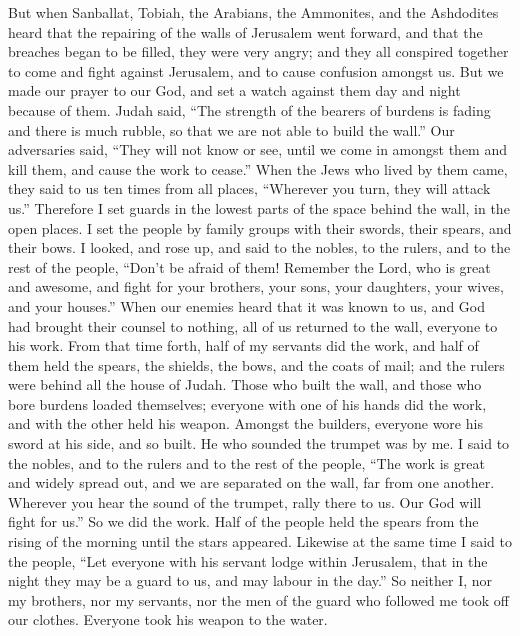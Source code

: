  But when Sanballat, Tobiah, the Arabians, the Ammonites,
and the Ashdodites heard that the repairing of the walls of Jerusalem
went forward, and that the breaches began to be filled, they were very
angry;  and they all conspired together to come and fight
against Jerusalem, and to cause confusion amongst us.  But
we made our prayer to our God, and set a watch against them day and
night because of them.  Judah said, ``The strength of the
bearers of burdens is fading and there is much rubble, so that we are
not able to build the wall.''  Our adversaries said,
``They will not know or see, until we come in amongst them and kill
them, and cause the work to cease.''  When the Jews who
lived by them came, they said to us ten times from all places,
``Wherever you turn, they will attack us.''  Therefore I
set guards in the lowest parts of the space behind the wall, in the open
places. I set the people by family groups with their swords, their
spears, and their bows.  I looked, and rose up, and said
to the nobles, to the rulers, and to the rest of the people, ``Don't be
afraid of them! Remember the Lord, who is great and awesome, and fight
for your brothers, your sons, your daughters, your wives, and your
houses.''  When our enemies heard that it was known to
us, and God had brought their counsel to nothing, all of us returned to
the wall, everyone to his work.  From that time forth,
half of my servants did the work, and half of them held the spears, the
shields, the bows, and the coats of mail; and the rulers were behind all
the house of Judah.  Those who built the wall, and those
who bore burdens loaded themselves; everyone with one of his hands did
the work, and with the other held his weapon.  Amongst
the builders, everyone wore his sword at his side, and so built. He who
sounded the trumpet was by me.  I said to the nobles, and
to the rulers and to the rest of the people, ``The work is great and
widely spread out, and we are separated on the wall, far from one
another.  Wherever you hear the sound of the trumpet,
rally there to us. Our God will fight for us.''  So we
did the work. Half of the people held the spears from the rising of the
morning until the stars appeared.  Likewise at the same
time I said to the people, ``Let everyone with his servant lodge within
Jerusalem, that in the night they may be a guard to us, and may labour
in the day.''  So neither I, nor my brothers, nor my
servants, nor the men of the guard who followed me took off our clothes.
Everyone took his weapon to the water.

